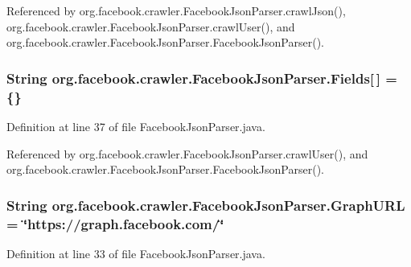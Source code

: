 Referenced by org.\-facebook.\-crawler.\-Facebook\-Json\-Parser.\-crawl\-Json(), org.\-facebook.\-crawler.\-Facebook\-Json\-Parser.\-crawl\-User(), and org.\-facebook.\-crawler.\-Facebook\-Json\-Parser.\-Facebook\-Json\-Parser().

\hypertarget{classorg_1_1facebook_1_1crawler_1_1_facebook_json_parser_a5e950f9470c73a8ee7cfdafbe95ab100}{
\subsubsection[{Fields}]{\setlength{\rightskip}{0pt plus 5cm}String org.\-facebook.\-crawler.\-Facebook\-Json\-Parser.\-Fields\mbox{[}$\,$\mbox{]} = \{\}\hspace{0.3cm}{\ttfamily [private]}}}\label{classorg_1_1facebook_1_1crawler_1_1_facebook_json_parser_a5e950f9470c73a8ee7cfdafbe95ab100}


Definition at line 37 of file Facebook\-Json\-Parser.\-java.



Referenced by org.\-facebook.\-crawler.\-Facebook\-Json\-Parser.\-crawl\-User(), and org.\-facebook.\-crawler.\-Facebook\-Json\-Parser.\-Facebook\-Json\-Parser().

\hypertarget{classorg_1_1facebook_1_1crawler_1_1_facebook_json_parser_a432ef64a6d8e4575ff9e1f03a2fb1ab2}{
\subsubsection[{Graph\-U\-R\-L}]{\setlength{\rightskip}{0pt plus 5cm}String org.\-facebook.\-crawler.\-Facebook\-Json\-Parser.\-Graph\-U\-R\-L = \char`\"{}https\-://graph.\-facebook.\-com/\char`\"{}\hspace{0.3cm}{\ttfamily [private]}}}\label{classorg_1_1facebook_1_1crawler_1_1_facebook_json_parser_a432ef64a6d8e4575ff9e1f03a2fb1ab2}


Definition at line 33 of file Facebook\-Json\-Parser.\-java.



